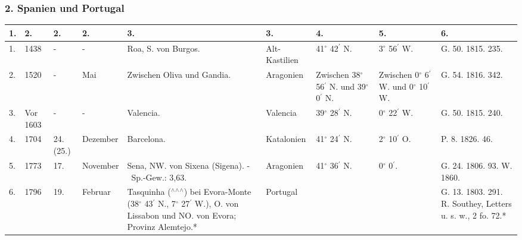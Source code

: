 \documentclass[a4paper, 11pt, oneside, polutonikogreek, german]{article}
\begin{document}
\clearpage
\begin{landscape}
\subsubsection{2. Spanien und Portugal}
\begin{table}[!ht]
    \centering
    \footnotesize
    \begin{tabular}{|l|l|l|l|p{40mm}|l|p{14mm}|p{14mm}|p{18mm}|}
    \hline
        1. & 2. & 2. & 2. & 3. & 3. & 4. & 5. & 6. \\ \hline
        1. & 1438 & - & - & Roa, S. von Burgos. & Alt-Kastilien & 41$^\circ$ 42$^\prime$ N. & 3$^\circ$ 56$^\prime$ W. & G. 50. 1815. 235. \\ \hline
        2. & 1520 & - & Mai & Zwischen Oliva und Gandia. & Aragonien & Zwischen 38$^\circ$ 56$^\prime$ N. und 39$^\circ$ 0$^\prime$ N. & Zwischen 0$^\circ$ 6$^\prime$ W. und 0$^\circ$ 10$^\prime$ W. & G. 54. 1816. 342. \\ \hline
        3. & Vor 1603 & - & - & Valencia. & Valencia & 39$^\circ$ 28$^\prime$ N. & 0$^\circ$ 22$^\prime$ W. & G. 50. 1815. 240. \\ \hline
        4. & 1704 & 24. (25.) & Dezember & Barcelona. & Katalonien & 41$^\circ$ 24$^\prime$ N. & 2$^\circ$ 10$^\prime$ O. & P. 8. 1826. 46. \\ \hline
        5. & 1773 & 17. & November & Sena, NW. von Sixena (Sigena). - Sp.-Gew.: 3,63. & Aragonien & 41$^\circ$ 36$^\prime$ N. & 0$^\circ$ 0$^\prime$. & G. 24. 1806. 93. W. 1860. \\ \hline
        6. & 1796 & 19. & Februar & Tasquinha ($^\wedge$$^\wedge$$^\wedge$) bei Evora-Monte (38$^\circ$ 43$^\prime$ N., 7$^\circ$ 27$^\prime$ W.), O. von Lissabon und NO. von Evora; Provinz Alemtejo.* & Portugal & ~ & ~ & G. 13. 1803. 291. R. Southey, Letters u. s. w., 2 fo. 72.* \\ \hline
    \end{tabular}
\end{table}
\end{landscape}
\clearpage
\end{document}
